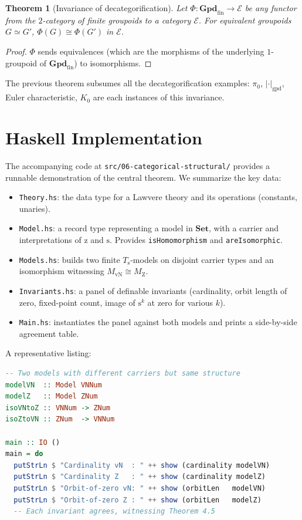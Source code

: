 \documentclass[12pt]{article}
\newtheorem{theorem}{Theorem}[section]
\theoremstyle{definition}
\theoremstyle{remark}
\newcommand{\Set}{\mathbf{Set}}
\newcommand{\E}{\mathcal{E}}
\newcommand{\eq}{\simeq}
\newcommand{\iso}{\cong}
\newcommand{\succop}{\mathrm{s}}
\newcommand{\zeroop}{\mathrm{z}}
\begin{document}
\begin{theorem}[Invariance of decategorification]
Let $\Phi : \mathbf{Gpd}_{\mathrm{fin}} \to \E$ be any functor from the $2$-category of finite groupoids to a category $\E$. For equivalent groupoids $G \eq G'$, $\Phi(G) \iso \Phi(G')$ in $\E$.
\end{theorem}

\begin{proof}
$\Phi$ sends equivalences (which are the morphisms of the underlying $1$-groupoid of $\mathbf{Gpd}_{\mathrm{fin}}$) to isomorphisms.
\end{proof}

The previous theorem subsumes all the decategorification examples: $\pi_0$, $|\cdot|_{\mathrm{gpd}}$, Euler characteristic, $K_0$ are each instances of this invariance.

\section{Haskell Implementation}\label{sec:haskell}

The accompanying code at \texttt{src/06-categorical-structural/} provides a runnable demonstration of the central theorem. We summarize the key data:

\begin{itemize}
  \item \texttt{Theory.hs}: the data type for a Lawvere theory and its operations (constants, unaries).
  \item \texttt{Model.hs}: a record type representing a model in $\Set$, with a carrier and interpretations of $\zeroop$ and $\succop$. Provides \texttt{isHomomorphism} and \texttt{areIsomorphic}.
  \item \texttt{Models.hs}: builds two finite $T_\succop$-models on disjoint carrier types and an isomorphism witnessing $M_{\mathrm{vN}} \iso M_{\mathrm{Z}}$.
  \item \texttt{Invariants.hs}: a panel of definable invariants (cardinality, orbit length of zero, fixed-point count, image of $\succop^k$ at zero for various $k$).
  \item \texttt{Main.hs}: instantiates the panel against both models and prints a side-by-side agreement table.
\end{itemize}

A representative listing:

\begin{lstlisting}[language=Haskell]
-- Two models with different carriers but same structure
modelVN  :: Model VNNum
modelZ   :: Model ZNum
isoVNtoZ :: VNNum -> ZNum
isoZtoVN :: ZNum  -> VNNum

main :: IO ()
main = do
  putStrLn $ "Cardinality vN  : " ++ show (cardinality modelVN)
  putStrLn $ "Cardinality Z   : " ++ show (cardinality modelZ)
  putStrLn $ "Orbit-of-zero vN: " ++ show (orbitLen   modelVN)
  putStrLn $ "Orbit-of-zero Z : " ++ show (orbitLen   modelZ)
  -- Each invariant agrees, witnessing Theorem 4.5
\end{lstlisting}
\end{document}
